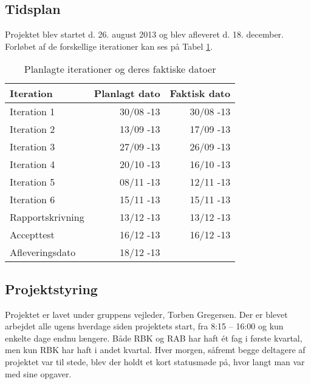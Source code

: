 \documentclass[Main]{subfiles}
\begin{document}
\subsection{Tidsplan}
Projektet blev startet d. 26. august 2013 og blev afleveret d. 18. december.
Forløbet af de forskellige iterationer kan ses på Tabel \ref{Tab:Tidsplan}.

\begin{table}[H]
\centering
	\begin{tabular}{l r r}
	\hline
	\textbf{Iteration} & \textbf{Planlagt dato} & \textbf{Faktisk dato} \\ \hline
	Iteration 1 & 30/08 -13 & 30/08 -13\\
	Iteration 2 & 13/09 -13 & 17/09 -13\\
	Iteration 3 & 27/09 -13 & 26/09 -13\\
	Iteration 4 & 20/10 -13 & 16/10 -13\\
	Iteration 5 & 08/11 -13 & 12/11 -13\\
	Iteration 6 & 15/11 -13 & 15/11 -13\\
	Rapportskrivning & 13/12 -13 & 13/12 -13 \\
	Accepttest	& 16/12 -13 & 16/12 -13\\
	Afleveringsdato & 18/12 -13 & 
	\\ \hline
	\end{tabular}
\caption{Planlagte iterationer og deres faktiske datoer}
\label{Tab:Tidsplan}
\end{table}


\subsection{Projektstyring}
Projektet er lavet under gruppens vejleder, Torben Gregersen.
Der er blevet arbejdet alle ugens hverdage siden projektets start, fra 8:15 -- 16:00 og kun enkelte dage endnu længere.
Både RBK og RAB har haft ét fag i første kvartal, men kun RBK har haft i andet kvartal.
Hver morgen, såfremt begge deltagere af projektet var til stede, blev der holdt et kort statusmøde på, hvor langt man var med sine opgaver.
\end{document}
